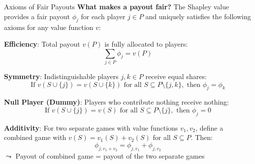 \documentclass[10pt,compress,t,notes=noshow, xcolor=table]{beamer}
\begin{document}
\begin{framev}[align=top]{Axioms of Fair Payouts}
\textbf{What makes a payout fair?} The Shapley value provides a fair payout $\phi_j$ for each player $j \in P$ and uniquely satisfies the following axioms for any value function $v$:\\
\spacer[0.25]
\begin{itemizeM}
\item<+-> \textbf{Efficiency}: Total payout $v(P)$ is fully allocated to players:
$$
\textstyle \sum_{j \in P} \phi_j = v(P)
$$
\item<+-> \textbf{Symmetry}: Indistinguishable players $j,k \in P$ receive equal shares:
$$
\text{If } v(S \cup \{j\}) = v(S \cup \{k\}) \text{ for all } S \subseteq P \setminus \{j,k\}, \text{ then } \phi_j = \phi_k
$$
\item<+-> \textbf{Null Player (Dummy)}: Players who contribute nothing receive nothing:
$$
\text{If } v(S \cup \{j\}) = v(S) \text{ for all } S \subseteq P \setminus \{j\}, \text{ then } \phi_j = 0
$$
\item<+-> \textbf{Additivity}: For two separate games with value functions $v_1, v_2$, define a combined game with $v(S) = v_1(S) + v_2(S)$ for all $S \subseteq P$. Then:
$$
\phi_{j, v_1 + v_2} = \phi_{j, v_1} + \phi_{j, v_2}
$$
$\leadsto$ Payout of combined game = payout of the two separate games
\end{itemizeM}
\end{framev}
\end{document}
